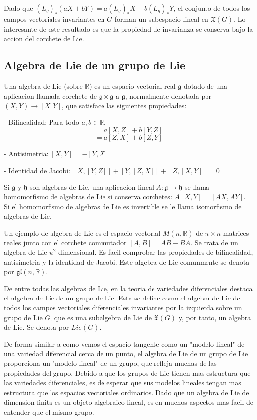 \documentclass[12pt]{extarticle}
\newcommand{\R}{\mathbb{R}}
\newcommand{\g}{\mathfrak{g}}
\newcommand{\h}{\mathfrak{h}}
\newcommand{\<}{\langle}
\renewcommand{\>}{\rangle}
\theoremstyle{definition}
\begin{document}
Dado que $(L_g)_{*}(aX + bY) = a(L_g)_{*}X + b(L_g)_{*}Y$, el conjunto de todos
los campos vectoriales invariantes en $G$ forman un subespacio lineal en
$\mathfrak{X}(G)$. Lo interesante de este resultado es que la propiedad de
invarianza se conserva bajo la accion del corchete de Lie.

\subsection{Algebra de Lie de un grupo de Lie}
Una algebra de Lie (sobre $\R$) es un espacio vectorial real $\g$ dotado de
una aplicacion llamada corchete de $\g \times \g$ a $\g$, normalmente
denotada por $(X, Y) \rightarrow [X, Y]$, que satisface las siguientes
propiedades:

- Bilinealidad: Para todo $a, b \in \R$,
\begin{equation*}
[aX + bY, Z] = a[X, Z] + b[Y, Z]
\end{equation*}
\begin{equation*}
[Z, aX + bY] = a[Z, X] + b[Z, Y]
\end{equation*}

- Antisimetria: $[X, Y] = -[Y, X]$

- Identidad de Jacobi: $[X, [Y, Z]] + [Y, [Z,X]] + [Z, [X, Y]] = 0$

Si $\g$ y $\h$ son algebras de Lie, una aplicacion lineal $A: \g \rightarrow \h$
se llama homomorfismo de algebras de Lie si conserva corchetes: $A[X, Y] = [AX,
AY]$. Si el homomorfismo de algebras de Lie es invertible se le llama
isomorfismo de algebras de Lie.

Un ejemplo de algebra de Lie es el espacio vectorial $M(n, \R)$ de $n
\times n$ matrices reales junto con el corchete commutador $[A, B] = AB - BA$.
Se trata de un algebra de Lie $n^2$-dimensional. Es facil comprobar las
propiedades de bilinealidad, antisimetria y la identidad de Jacobi. Este algebra
de Lie comunmente se denota por $\mathfrak{g}\mathfrak{l}(n, \R)$.

De entre todas las algebras de Lie, en la teoria de variedades diferenciales destaca el
algebra de Lie de un grupo de Lie. Esta se define como el algebra de Lie de
todos los campos vectoriales diferenciales invariantes por la izquierda sobre un
grupo de Lie $G$, que es una subalgebra de Lie de $\mathfrak{X}(G)$ y, por
tanto, un algebra de Lie. Se denota por $Lie(G)$.

De forma similar a como vemos el espacio tangente como un "modelo lineal" de una
variedad diferencial cerca de un punto, el algebra de Lie de un grupo de Lie
proporciona un "modelo lineal" de un grupo, que refleja muchas de las
propiedades del grupo. Debido a que los grupos de Lie tienen mas estructura que
las variedades diferenciales, es de esperar que sus modelos lineales tengan mas
estructura que los espacios vectoriales ordinarios. Dado que un algebra de Lie
de dimension finita es un objeto algebraico lineal, es en muchos aspectos mas
facil de entender que el mismo grupo.
\end{document}
